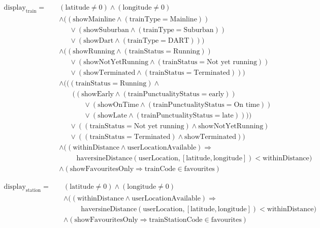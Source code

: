 \documentclass[a4paper,11pt]{report}
\begin{document}
\begin{align*}
\text{display}_{\text{train}} =\quad
& (\text{latitude} \neq 0) \land (\text{longitude} \neq 0) \\
& \land \big( (\text{showMainline} \land (\text{trainType} = \text{Mainline})) \\
& \quad\ \ \lor (\text{showSuburban} \land (\text{trainType} = \text{Suburban})) \\
& \quad\ \ \lor (\text{showDart} \land (\text{trainType} = \text{DART})) \big) \\
& \land \big( (\text{showRunning} \land (\text{trainStatus} = \text{Running})) \\
& \quad\ \ \lor (\text{showNotYetRunning} \land (\text{trainStatus} = \text{Not yet running})) \\
& \quad\ \ \lor (\text{showTerminated} \land (\text{trainStatus} = \text{Terminated})) \big) \\
& \land \big( ((\text{trainStatus} = \text{Running}) \land \\
& \quad\ \ \ \ ((\text{showEarly} \land (\text{trainPunctualityStatus} = \text{early})) \\
& \quad\quad\quad\ \ \lor (\text{showOnTime} \land (\text{trainPunctualityStatus} = \text{On time})) \\
& \quad\quad\quad\ \ \lor (\text{showLate} \land (\text{trainPunctualityStatus} = \text{late})))) \\
& \quad\ \ \lor ((\text{trainStatus} = \text{Not yet running}) \land \text{showNotYetRunning}) \\
& \quad\ \ \lor ((\text{trainStatus} = \text{Terminated}) \land \text{showTerminated}) \big) \\
& \land \big( (\text{withinDistance} \land \text{userLocationAvailable}) \Rightarrow \\
& \quad\quad\ \ \text{haversineDistance}(\text{userLocation}, [\text{latitude}, \text{longitude}]) < \text{withinDistance} \big) \\
& \land \left( \text{showFavouritesOnly} \Rightarrow \text{trainCode} \in \text{favourites} \right)
\end{align*}

\begin{align*}
\text{display}_{\text{station}} =\quad
& (\text{latitude} \neq 0) \land (\text{longitude} \neq 0) \\
& \land \big( (\text{withinDistance} \land \text{userLocationAvailable}) \Rightarrow \\
& \quad\quad\ \ \text{haversineDistance}(\text{userLocation}, [\text{latitude}, \text{longitude}]) < \text{withinDistance} \big) \\
& \land \left( \text{showFavouritesOnly} \Rightarrow \text{trainStationCode} \in \text{favourites} \right)
\end{align*}
\end{document}
